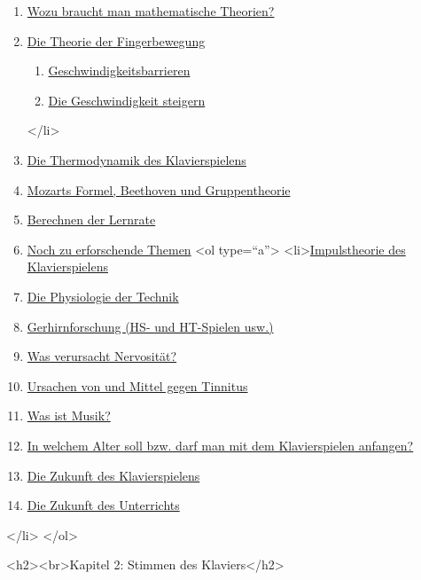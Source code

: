\begin{enumerate} 
 \item \hyperref[c1iv1]{Wozu braucht man mathematische Theorien?}
 \item \hyperref[c1iv2]{Die Theorie der Fingerbewegung}
   \begin{enumerate}[label={\alph*.}] 
    <li>\hyperref[c1iv2a]{Serielles und paralleles Spielen}
    \item \hyperref[c1iv2b]{Geschwindigkeitsbarrieren}
    \item \hyperref[c1iv2c]{Die Geschwindigkeit steigern}
   \end{enumerate}
 </li>
 \item \hyperref[c1iv3]{Die Thermodynamik des Klavierspielens}
 \item \hyperref[c1iv4]{Mozarts Formel, Beethoven und Gruppentheorie}
 \item \hyperref[c1iv5]{Berechnen der Lernrate}
 \item \hyperref[c1iv6]{Noch zu erforschende Themen}
   <ol type=\enquote{a}>
    <li>\hyperref[c1iv6a]{Impulstheorie des Klavierspielens}
    \item \hyperref[c1iv6b]{Die Physiologie der Technik}
    \item \hyperref[c1iv6c]{Gerhirnforschung (HS- und HT-Spielen usw.)}
    \item \hyperref[c1iv6d]{Was verursacht Nervosität?}
    \item \hyperref[c1iv6e]{Ursachen von und Mittel gegen Tinnitus}
    \item \hyperref[c1iv6f]{Was ist Musik?}
    \item \hyperref[c1iv6g]{In welchem Alter soll bzw. darf man mit dem Klavierspielen anfangen?}
    \item \hyperref[c1iv6h]{Die Zukunft des Klavierspielens}
    \item \hyperref[c1iv6i]{Die Zukunft des Unterrichts}
    \end{enumerate}
 </li>
</ol>

<h2><br>Kapitel 2: Stimmen des Klaviers</h2> 

